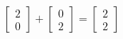 \documentclass[preview]{standalone}
\begin{document}
\begin{align*}
\begin{bmatrix} 2 \\ 0 \end{bmatrix} + \begin{bmatrix} 0 \\ 2 \end{bmatrix} = \begin{bmatrix} 2 \\ 2 \end{bmatrix}
\end{align*}
\end{document}
